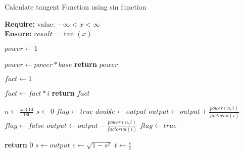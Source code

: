 \documentclass{article}
\begin{document}
\begin{algorithm}

\caption{Calculate tangent Function using sin function}

\textbf{Require:}  value: $-\infty<x<\infty$\\
\textbf{Ensure:} $result = \tan(x)$
\begin{algorithmic}[1]

    \State $power \leftarrow 1$
    
    \State $power \leftarrow power * base$
    \EndFor
    \State \textbf{return} $power$
    \EndProcedure
\Statex

    \State $fact \leftarrow 1$
    
    \State $fact \leftarrow fact * i$
    \EndFor
    \State \textbf{return} $fact$
    \EndProcedure
\Statex

\State $n \leftarrow \frac{x.3.14}{180}$
\State $s \leftarrow 0$ 
\State $flag \leftarrow true$ 
\State $double \leftarrow output$
    \State $output \leftarrow output +\frac{power(n,i)}{factorial(i)}$
    \State $flag \leftarrow false$
  \Else
    \State $output \leftarrow output -\frac{power(n,i)}{factorial(i)}$
     \State$ flag \leftarrow true$
     
     \EndIf
     \Else
     \State \textbf{return} 0
     \EndIf
    \EndFor
    \State $s \leftarrow output$
    \Statex
    \State $c \leftarrow \sqrt{1-s^{2}}$
    \Statex
    $t \leftarrow \frac{s}{c}$
    \end{algorithmic}
    \end{algorithm}
\end{document}
